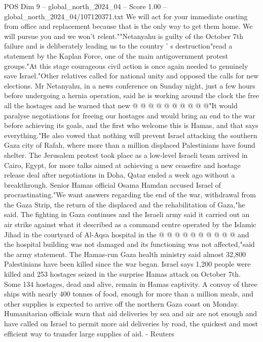 \begin{textsample}{POS Dim 9 – global\_north\_2024\_04 – Score 1.00 – global\_north\_2024\_04/107120371.txt}
We will act for your immediate ousting from office and replacement because that is the only way to get them home.
We will pursue you and we won't relent.""Netanyahu is guilty of the October 7th failure and is deliberately leading us to the country ' s destruction"read a statement by the Kaplan Force, one of the main antigovernment protest groups."At this stage courageous civil action is once again needed to genuinely save Israel."Other relatives called for national unity and opposed the calls for new elections.
Mr Netanyahu, in a news conference on Sunday night, just a few hours before undergoing a hernia operation, said he is working around the clock the free all the hostages and he warned that new @ @ @ @ @ @ @ @ @ @"It would paralyse negotiations for freeing our hostages and would bring an end to the war before achieving its goals, and the first who welcome this is Hamas, and that says everything."He also vowed that nothing will prevent Israel attacking the southern Gaza city of Rafah, where more than a million displaced Palestinians have found shelter.
The Jerusalem protest took place as a low-level Israeli team arrived in Cairo, Egypt, for more talks aimed at achieving a new ceasefire and hostage release deal after negotiations in Doha, Qatar ended a week ago without a breakthrough.
Senior Hamas official Osama Hamdan accused Israel of procrastinating."We want answers regarding the end of the war, withdrawal from the Gaza Strip, the return of the displaced and the rehabilitation of Gaza,"he said.
The fighting in Gaza continues and the Israeli army said it carried out an air strike against what it described as a command centre operated by the Islamic Jihad in the courtyard of Al-Aqsa hospital in the @ @ @ @ @ @ @ @ @ @ and the hospital building was not damaged and its functioning was not affected,"said the army statement.
The Hamas-run Gaza health ministry said almost 32,800 Palestinians have been killed since the war began.
Israel says 1,200 people were killed and 253 hostages seized in the surprise Hamas attack on October 7th.
Some 134 hostages, dead and alive, remain in Hamas captivity.
A convoy of three ships with nearly 400 tonnes of food, enough for more than a million meals, and other supplies is expected to arrive off the northern Gaza coast on Monday.
Humanitarian officials warn that aid deliveries by sea and air are not enough and have called on Israel to permit more aid deliveries by road, the quickest and most efficient way to transfer large supplies of aid. - Reuters

\end{textsample}

